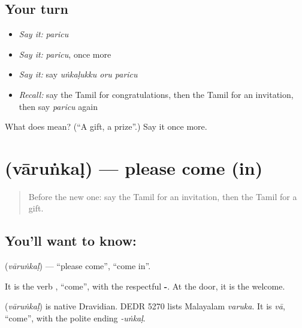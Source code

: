 \subsection*{Your turn}
\begin{itemize}
\raggedright
  \item \emph{Say it:} \emph{paricu}
  \item \emph{Say it:} \emph{paricu}, once more
  \item \emph{Say it:} say \emph{uṅkaḷukku oru paricu}
  \item \emph{Recall:} say the Tamil for congratulations, then the Tamil for an invitation, then say \emph{paricu} again
\end{itemize}

\begin{tcolorbox}[breakable,colback=teal!4,colframe=teal!35!black,title={Before you move on}]
What does  mean? (\textquotedblleft{}A gift, a prize\textquotedblright{}.) Say it once more.
\end{tcolorbox}
\section[\texorpdfstring{\ta{வாருங்கள்} (vāruṅkaḷ)}{வாருங்கள் (vāruṅkaḷ)}]{ (vāruṅkaḷ) — please come (in)}

\label{lesson:TA-C98-comein}



\begin{quote}
Before the new one: say the Tamil for an invitation, then the Tamil for a gift.
\end{quote}

\subsection*{You'll want to know: }
\textbf{} (\emph{vāruṅkaḷ}) — \textquotedblleft{}please come\textquotedblright{}, \textquotedblleft{}come in\textquotedblright{}.

It is the verb \textbf{}, \textquotedblleft{}come\textquotedblright{}, with the respectful \textbf{-}. At the door, it is the welcome.

\begin{cousinweb}
\textbf{} (\emph{vāruṅkaḷ}) is native Dravidian. DEDR 5270 lists Malayalam \emph{varuka}. It is \emph{vā}, \textquotedblleft{}come\textquotedblright{}, with the polite ending \emph{-uṅkaḷ}.
\end{cousinweb}

